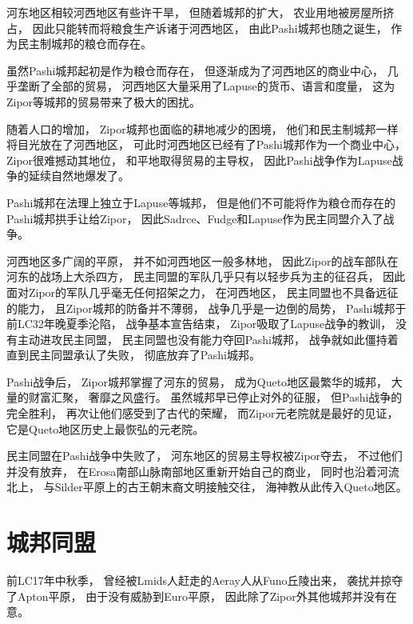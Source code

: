 \documentclass[UTF8,12pt]{ctexbook}
\begin{document}
            河东地区相较河西地区有些许干旱，
            但随着城邦的扩大，
            农业用地被房屋所挤占，
            因此只能转而将粮食生产诉诸于河西地区，
            由此Pashi城邦也随之诞生，
            作为民主制城邦的粮仓而存在。

            虽然Pashi城邦起初是作为粮仓而存在，
            但逐渐成为了河西地区的商业中心，
            几乎垄断了全部的贸易，
            河西地区大量采用了Lapuse的货币、语言和度量，
            这为Zipor等城邦的贸易带来了极大的困扰。

            随着人口的增加，
            Zipor城邦也面临的耕地减少的困境，
            他们和民主制城邦一样将目光放在了河西地区，
            可此时河西地区已经有了Pashi城邦作为一个商业中心，
            Zipor很难撼动其地位，
            和平地取得贸易的主导权，
            因此Pashi战争作为Lapuse战争的延续自然地爆发了。

            Pashi城邦在法理上独立于Lapuse等城邦，
            但是他们不可能将作为粮仓而存在的Pashi城邦拱手让给Zipor，
            因此Sadrce、Fudge和Lapuse作为民主同盟介入了战争。

            河西地区多广阔的平原，
            并不如河西地区一般多林地，
            因此Zipor的战车部队在河东的战场上大杀四方，
            民主同盟的军队几乎只有以轻步兵为主的征召兵，
            因此面对Zipor的军队几乎毫无任何招架之力，
            在河西地区，
            民主同盟也不具备远征的能力，
            且Zipor城邦的防备并不薄弱，
            战争几乎是一边倒的局势，
            Pashi城邦于前LC32年晚夏季沦陷，
            战争基本宣告结束，
            Zipor吸取了Lapuse战争的教训，
            没有主动进攻民主同盟，
            民主同盟也没有能力夺回Pashi城邦，
            战争就如此僵持着直到民主同盟承认了失败，
            彻底放弃了Pashi城邦。

            Pashi战争后，
            Zipor城邦掌握了河东的贸易，
            成为Queto地区最繁华的城邦，
            大量的财富汇聚，
            奢靡之风盛行。
            虽然城邦早已停止对外的征服，
            但Pashi战争的完全胜利，
            再次让他们感受到了古代的荣耀，
            而Zipor元老院就是最好的见证，
            它是Queto地区历史上最恢弘的元老院。

            民主同盟在Pashi战争中失败了，
            河东地区的贸易主导权被Zipor夺去，
            不过他们并没有放弃，
            在Erosa南部山脉南部地区重新开始自己的商业，
            同时也沿着河流北上，
            与Silder平原上的古王朝末裔文明接触交往，
            海神教从此传入Queto地区。
        \section{城邦同盟}
            前LC17年中秋季，
            曾经被Lmids人赶走的Aeray人从Funo丘陵出来，
            袭扰并掠夺了Apton平原，
            由于没有威胁到Euro平原，
            因此除了Zipor外其他城邦并没有在意。
\end{document}
